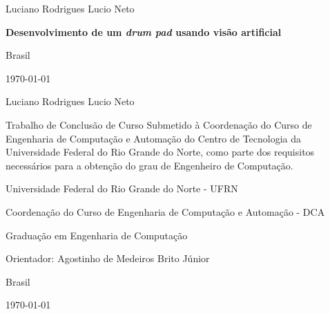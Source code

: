 \documentclass[12pt]{report}
\def\worktitle{Desenvolvimento de um {\it drum pad} usando visão artificial}
\def\workauthor{Luciano Rodrigues Lucio Neto}
\begin{document}
\begin{titlepage}

  \centering
  {\normalsize \workauthor \par}
  \vfill
  {\Large\bfseries \worktitle \par}
  \vfill


  {\normalsize Brasil\par}
  {\normalsize \monthyeardate\today}
\end{titlepage}

\begin{titlepage}

  \centering
  {\normalsize \workauthor\par}
  \vfill
  \centering
  {\Large\bfseries \par}
  \vfill

  \begin{flushright}  
  \begin{minipage}{15em}  
    Trabalho de Conclusão de Curso Submetido à Coordenação do Curso de Engenharia de Computação e Automação do Centro de Tecnologia da Universidade Federal do Rio Grande do Norte, como parte dos requisitos necessários para a obtenção do grau de Engenheiro de Computação.
  \end{minipage}
  \end{flushright}  
  \vfill
  
  
  {\small Universidade Federal do Rio Grande do Norte - UFRN \par}
  {\small Coordenação do Curso de Engenharia de Computação e Automação - DCA \par}
  {\small Graduação em Engenharia de Computação \par}
  \vfill
  \normalsize
  \centering
  {\normalsize Orientador: Agostinho de Medeiros Brito Júnior \par}
  \vfill
  {\normalsize Brasil\par}
  {\normalsize \monthyeardate\today}
\end{titlepage}
\end{document}
